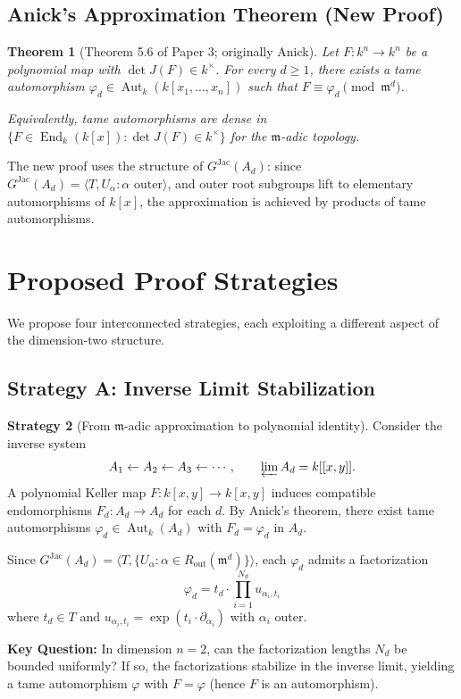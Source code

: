 \documentclass[12pt,a4paper]{article}
\newtheorem{theorem}{Theorem}[section]
\theoremstyle{definition}
\newtheorem{strategy}[theorem]{Strategy}
\newcommand{\kk}{k}
\newcommand{\pp}{\mathfrak{m}}
\newcommand{\Aut}{\operatorname{Aut}}
\newcommand{\End}{\operatorname{End}}
\newcommand{\GJac}{G^{\mathrm{Jac}}}
\begin{document}
\subsection{Anick's Approximation Theorem (New Proof)}

\begin{theorem}[Theorem 5.6 of Paper 3; originally Anick]
Let $F: \kk^n \to \kk^n$ be a polynomial map with $\det J(F) \in \kk^\times$. For every
$d \geq 1$, there exists a tame automorphism $\varphi_d \in \Aut_\kk(\kk[x_1,\ldots,x_n])$
such that $F \equiv \varphi_d \pmod{\pp^d}$.

Equivalently, tame automorphisms are dense in
$\{F \in \End_\kk(\kk[x]) : \det J(F) \in \kk^\times\}$ for the $\pp$-adic topology.
\end{theorem}

The new proof uses the structure of $\GJac(A_d)$: since $\GJac(A_d) = \langle T, U_\alpha :
\alpha \text{ outer}\rangle$, and outer root subgroups lift to elementary automorphisms of
$\kk[x]$, the approximation is achieved by products of tame automorphisms.

\section{Proposed Proof Strategies}

We propose four interconnected strategies, each exploiting a different aspect of the
dimension-two structure.

\subsection{Strategy A: Inverse Limit Stabilization}

\begin{strategy}[From $\pp$-adic approximation to polynomial identity]
Consider the inverse system
\[
  A_1 \leftarrow A_2 \leftarrow A_3 \leftarrow \cdots, \qquad
  \varprojlim A_d = \kk[[x,y]].
\]
A polynomial Keller map $F: \kk[x,y] \to \kk[x,y]$ induces compatible endomorphisms
$F_d: A_d \to A_d$ for each $d$. By Anick's theorem, there exist tame automorphisms
$\varphi_d \in \Aut_\kk(A_d)$ with $F_d = \varphi_d$ in $A_d$.

Since $\GJac(A_d) = \langle T, \{U_\alpha : \alpha \in R_{\mathrm{out}}(\pp^d)\}\rangle$,
each $\varphi_d$ admits a factorization
\[
  \varphi_d = t_d \cdot \prod_{i=1}^{N_d} u_{\alpha_i, t_i}
\]
where $t_d \in T$ and $u_{\alpha_i,t_i} = \exp(t_i \cdot \partial_{\alpha_i})$ with
$\alpha_i$ outer.

\textbf{Key Question:} In dimension $n = 2$, can the factorization lengths $N_d$ be bounded
uniformly? If so, the factorizations stabilize in the inverse limit, yielding a tame
automorphism $\varphi$ with $F = \varphi$ (hence $F$ is an automorphism).
\end{strategy}
\end{document}

